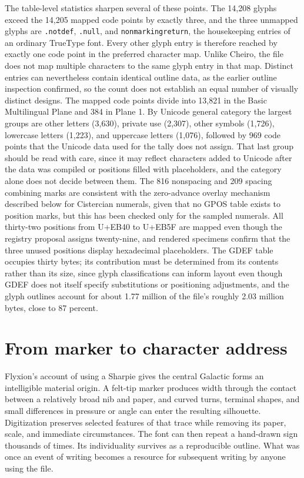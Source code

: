 \documentclass[11pt]{article}
\begin{document}
The table-level statistics sharpen several of these points. The 14,208 glyphs exceed the 14,205 mapped code points by exactly three, and the three unmapped glyphs are \texttt{.notdef}, \texttt{.null}, and \texttt{nonmarkingreturn}, the housekeeping entries of an ordinary TrueType font. Every other glyph entry is therefore reached by exactly one code point in the preferred character map. Unlike Cheiro, the file does not map multiple characters to the same glyph entry in that map. Distinct entries can nevertheless contain identical outline data, as the earlier outline inspection confirmed, so the count does not establish an equal number of visually distinct designs. The mapped code points divide into 13,821 in the Basic Multilingual Plane and 384 in Plane 1. By Unicode general category the largest groups are other letters (3,630), private use (2,307), other symbols (1,726), lowercase letters (1,223), and uppercase letters (1,076), followed by 969 code points that the Unicode data used for the tally does not assign. That last group should be read with care, since it may reflect characters added to Unicode after the data was compiled or positions filled with placeholders, and the category alone does not decide between them. The 816 nonspacing and 209 spacing combining marks are consistent with the zero-advance overlay mechanism described below for Cistercian numerals, given that no GPOS table exists to position marks, but this has been checked only for the sampled numerals. All thirty-two positions from U+EB40 to U+EB5F are mapped even though the registry proposal assigns twenty-nine, and rendered specimens confirm that the three unused positions display hexadecimal placeholders. The GDEF table occupies thirty bytes; its contribution must be determined from its contents rather than its size, since glyph classifications can inform layout even though GDEF does not itself specify substitutions or positioning adjustments, and the glyph outlines account for about 1.77 million of the file's roughly 2.03 million bytes, close to 87 percent.

\section{From marker to character address}

Flyxion's account of using a Sharpie gives the central Galactic forms an intelligible material origin. A felt-tip marker produces width through the contact between a relatively broad nib and paper, and curved turns, terminal shapes, and small differences in pressure or angle can enter the resulting silhouette. Digitization preserves selected features of that trace while removing its paper, scale, and immediate circumstances. The font can then repeat a hand-drawn sign thousands of times. Its individuality survives as a reproducible outline. What was once an event of writing becomes a resource for subsequent writing by anyone using the file.
\end{document}
